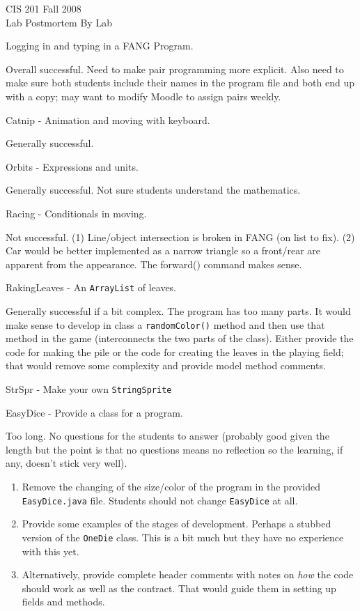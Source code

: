 \documentclass[10pt,oneside]{memoir}
\newcommand\code[1]{\lstinline^#1^}
\newcommand\fname[1]{\texttt{#1}}
\newcounter{LabPhase}
\newenvironment{LabExercises}{%
\renewcommand{\ExerciseListName}{Question}%
\renewcommand{\ExerciseListHeader}{\textbf{%
   Lab\ExerciseHeaderNB. }}
\begin{ExerciseList}}%
{\end{ExerciseList}}
\newcommand{\Lab}{\Exercise[name={Lab Phase\ExerciseHeaderNB},counter={LabPhase}]}
\begin{document}
\begin{center}
\Large{CIS 201 Fall 2008\\
Lab Postmortem By Lab}
\end{center}


\begin{LabExercises}
\Lab Logging in and typing in a FANG Program.

Overall successful. Need to make pair programming more explicit. Also
need to make sure both students include their names in the program
file and both end up with a copy; may want to modify Moodle to assign
pairs weekly.

\Lab Catnip - Animation and moving with keyboard.

Generally successful.

\Lab Orbits - Expressions and units.

Generally successful. Not sure students understand the mathematics.

\Lab Racing - Conditionals in moving.

Not successful. (1) Line/object intersection is broken in FANG (on
list to fix). (2) Car would be better implemented as a narrow triangle
so a front/rear are apparent from the appearance. The forward()
command makes sense. 

\Lab RakingLeaves - An \code{ArrayList} of leaves.

Generally successful if a bit complex. The program has too many
parts. It would make sense to develop in class a \code{randomColor()}
method and then use that method in the game (interconnects the two
parts of the class). Either provide the code for making the pile or
the code for creating the leaves in the playing field; that would
remove some complexity and provide model method comments. 

\Lab StrSpr - Make your own \code{StringSprite}

\Lab EasyDice - Provide a class for a program.

  Too long. No questions for the students to answer (probably good
  given the length but the point is that no questions means no
  reflection so the learning, if any, doesn't stick very well). 

  \begin{enumerate}
  \item Remove the changing of the size/color of the program in
    the provided \fname{EasyDice.java} file. Students should not change
    \code{EasyDice} at all.
  \item Provide some examples of the stages of development. Perhaps a
    stubbed version of the \code{OneDie} class. This is a bit much but
    they have no experience with this yet.
  \item Alternatively, provide complete header comments with notes on
    \emph{how} the code should work as well as the contract. That
    would guide them in setting up fields and methods.
  \end{enumerate}


\end{LabExercises}
\end{document}
